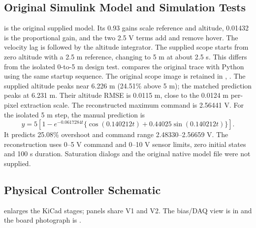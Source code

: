 \subsection{Original Simulink Model and Simulation Tests}\label{sec:simulation}
 is the original supplied model. Its 0.93 gains scale reference and altitude, 0.01432 is the proportional gain, and the two 2.5 V terms add and remove hover. The velocity lag is followed by the altitude integrator.
The supplied scope starts from zero altitude with a 2.5 m reference, changing to 5 m at about 2.5 s. This differs from the isolated 0-to-5 m design test.  compares the original trace with Python using the same startup sequence. The original scope image is retained in , .
The supplied altitude peaks near 6.226 m (24.51\% above 5 m); the matched prediction peaks at 6.231 m. Their altitude RMSE is 0.0115 m, close to the 0.0124 m per-pixel extraction scale. The reconstructed maximum command is 2.56441 V.
For the isolated 5 m step, the manual prediction is
\begin{equation}\label{eq:exactstep}
y=5\left[1-e^{-0.0617284t}\{\cos(0.140212t)+0.44025\sin(0.140212t)\}\right].
\end{equation}
It predicts 25.08\% overshoot and command range 2.48330--2.56659 V. The reconstruction uses 0--5 V command and 0--10 V sensor limits, zero initial states and 100 s duration. Saturation dialogs and the original native model file were not supplied.
\page

\subsection{Physical Controller Schematic}\label{sec:hardware}
 enlarges the KiCad stages; panels share V1 and V2. The bias/DAQ view is in  and the board photograph is .

